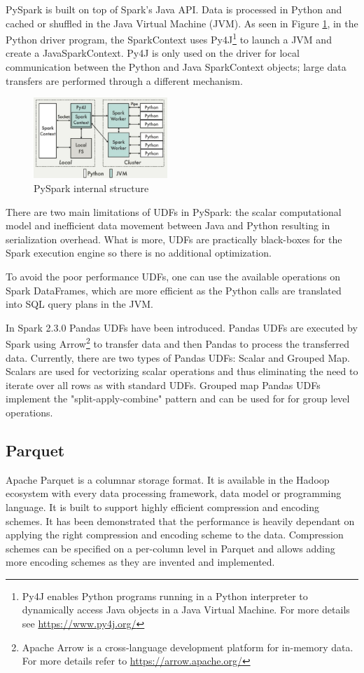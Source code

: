 PySpark is built on top of Spark's Java API. Data is processed in Python and cached or shuffled in the Java Virtual Machine (JVM). As seen in Figure \ref{fig:pyspark}, in the Python driver program, the SparkContext uses Py4J\footnote{Py4J enables Python programs running in a Python interpreter to dynamically access Java objects in a Java Virtual Machine. For more details see \url{https://www.py4j.org/}} to launch a JVM and create a JavaSparkContext. Py4J is only used on the driver for local communication between the Python and Java SparkContext objects; large data transfers are performed through a different mechanism.
\begin{figure}[h]
    \centering
    \includegraphics[width=0.45\textwidth]{images/pyspark.png}
    \caption{PySpark internal structure}
    \label{fig:pyspark}
\end{figure}

There are two main limitations of UDFs in PySpark: the scalar computational model and inefficient data movement between Java and Python resulting in serialization overhead. What is more, UDFs are practically black-boxes for the Spark execution engine so there is no additional optimization. 

To avoid the poor performance UDFs, one can use the available operations on Spark DataFrames, which are more efficient as the Python calls are translated into SQL query plans in the JVM. 

In Spark 2.3.0 Pandas UDFs have been introduced. Pandas UDFs are executed by Spark using Arrow\footnote{Apache Arrow is a cross-language development platform for in-memory data. For more details refer to \url{https://arrow.apache.org/}} to transfer data and then Pandas to process the transferred data. Currently, there are two types of Pandas UDFs: Scalar and Grouped Map. Scalars are used for vectorizing scalar operations and thus eliminating the need to iterate over all rows as with standard UDFs. Grouped map Pandas UDFs implement the "split-apply-combine" pattern and can be used for for group level operations.\cite{spark-sql}

\subsection{Parquet}
Apache Parquet is a columnar storage format. It is available in the Hadoop ecosystem with every data processing framework, data model or programming language. It is built to support highly efficient compression and encoding schemes. It has been demonstrated that the performance is heavily dependant on applying the right compression and encoding scheme to the data. Compression schemes can be specified on a per-column level in Parquet and allows adding more encoding schemes as they are invented and implemented.
\cite{parquet}

